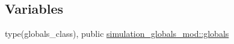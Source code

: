 \subsection*{Variables}
\begin{DoxyCompactItemize}
\item 
type(globals\+\_\+class), public \mbox{\hyperlink{namespacesimulation__globals__mod_a04123075b6de525703edb89697fc39e9}{simulation\+\_\+globals\+\_\+mod\+::globals}}
\end{DoxyCompactItemize}
